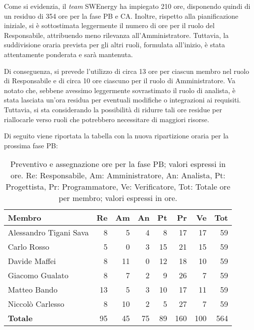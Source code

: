 Come si evidenzia, il \textit{team} SWEnergy ha impiegato 210 ore, disponendo quindi di un residuo di 354 ore per la fase PB e CA. Inoltre, rispetto alla pianificazione iniziale, 
si è sottostimata leggermente il numero di ore per il ruolo del Responsabile, attribuendo meno rilevanza all'Amministratore. Tuttavia, la suddivisione oraria prevista per gli altri ruoli, 
formulata all'inizio, è stata attentamente ponderata e sarà mantenuta.

Di conseguenza, si prevede l'utilizzo di circa 13 ore per ciascun membro nel ruolo di Responsabile e di circa 10 ore ciascuno per il ruolo di Amministratore. Va notato che, 
sebbene avessimo leggermente sovrastimato il ruolo di analista, è stata lasciata un'ora residua per eventuali modifiche o integrazioni ai requisiti. Tuttavia, si sta considerando 
la possibilità di ridurre tali ore residue per riallocarle verso ruoli che potrebbero necessitare di maggiori risorse.

Di seguito viene riportata la tabella con la nuova ripartizione oraria per la prossima fase PB:

\begin{table}[H]
	\renewcommand{\arraystretch}{1.5}
	\centering
	\begin{tabular}{l|r|r|r|r|r|r|r}
		\textbf{Membro} & \textbf{Re} & \textbf{Am} & \textbf{An} & \textbf{Pt}
		& \textbf{Pr} & \textbf{Ve} & \textbf{Tot} \\
		\hline
		Alessandro Tigani Sava 	&	8 	&  5 	& 4 	& 8 	&  17 	&  17 	&  59 \\
		Carlo Rosso 			&	5 	&  0 	& 3 	& 15 	&  21 	&  15 	&  59 \\
		Davide Maffei			&	8 	&  11 	& 0 	& 12 	&  18 	&  10 	&  59 \\
		Giacomo Gualato 		&	8 	&  7 	& 2 	& 9 	&  26 	&  7 	&  59 \\
		Matteo Bando 			&	13 	&  5 	& 3 	& 10 	&  17 	&  11 	&  59	\\
		Niccolò Carlesso 		&	8 	&  10 	& 2 	& 5 	&  27 	&  7 	&  59 \\
		\hline
		\textbf{Totale} 		&	95 & 45 & 75 & 89 & 160 & 100 & 564 \\
	\end{tabular}

	\caption{Preventivo e assegnazione ore per la fase PB; valori espressi in ore.
		Re: Responsabile, Am: Amministratore, An: Analista, Pt:
	Progettista, Pr: Programmatore, Ve: Verificatore, Tot: Totale ore per 
	membro; valori espressi in ore.}
\end{table}



